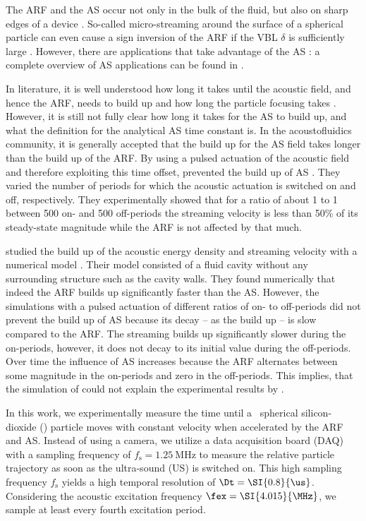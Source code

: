 The ARF and the AS occur not only in the bulk of the fluid, but also on sharp 
edges of a device \cite{Doinikov2020a,Doinikov2020b,Leibacher2015,Nama2016}. 
So-called micro-streaming around the surface of a spherical particle can even 
cause a sign inversion of the ARF if the VBL $\delta$ is 
sufficiently large \cite{Baasch2019}. However, there are applications that take 
advantage of the AS \cite{Antfolk2014,Mao2017,Hao2020}: a complete overview of 
AS applications can be found in \cite{Wiklund2012a}.

In literature, it is well understood how long it takes until the acoustic 
field, and hence the ARF, needs to build up \cite{Muller2015} and how long the 
particle focusing takes \cite{Bruus2012-10}. However, it is still not fully 
clear how long it takes for the AS to build up, and what the definition for the 
analytical AS time constant is. In the acoustofluidics community, it is 
generally accepted that the build up for the AS field takes longer than the 
build up of the ARF. By using a pulsed actuation of the acoustic field and 
therefore exploiting this time offset, \citeauthor{Hoyos2013} prevented the 
build up of AS \cite{Hoyos2013,Castro2016}. They varied the number of periods 
for which the acoustic actuation is switched on and off, respectively. They 
experimentally showed that for a ratio of about 1 to 1 between 500 on- and 500 
off-periods the streaming velocity is less than 50\% of its steady-state 
magnitude while the ARF is not affected by that much.

\citeauthor{Muller2015} studied the build up of the acoustic energy density and 
streaming velocity with a numerical model \cite{Muller2015}. Their model 
consisted of a fluid cavity without any surrounding structure such as the 
cavity walls. They found numerically that indeed the ARF builds up 
significantly faster than the AS. However, the simulations with a pulsed 
actuation of different ratios of on- to off-periods did not prevent the build 
up of AS because its decay -- as the build up -- is slow compared to the ARF. 
The streaming builds up significantly slower during the on-periods, however, it 
does not decay to its initial value during the off-periods. Over time the 
influence of AS increases because the ARF alternates between some magnitude in 
the on-periods and zero in the off-periods. This implies, that the simulation 
of \citeauthor{Muller2015} could not explain the experimental results by 
\citeauthor{Hoyos2013}.

In this work, we experimentally measure the time until a \Dtwo~spherical 
silicon-dioxide (\SiO) particle moves with constant velocity when accelerated 
by the ARF and AS. Instead of using a camera, we utilize a data acquisition 
board (DAQ) with a sampling frequency of $f_{\text{s}} = \SI{1.25}{\MHz}$ to 
measure the relative particle trajectory as soon as the ultra-sound (US) is 
switched on. This high sampling frequency $f_{\text{s}}$ yields a high 
temporal resolution of $ \Dt = \SI{0.8}{\us}$. Considering the acoustic 
excitation frequency $\fex = \SI{4.015}{\MHz}$, we sample at least every fourth 
excitation period.

